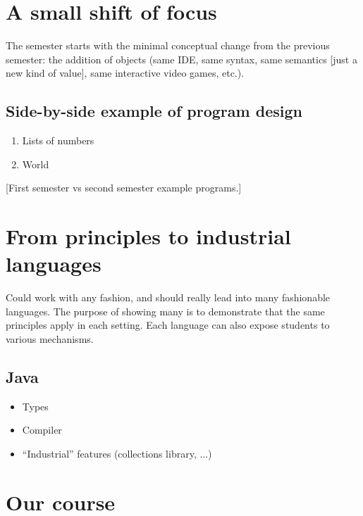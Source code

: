 \documentclass[submission,copyright]{eptcs}
\begin{document}
\cite{dvanhorn:Felleisen2004Structure}

\cite{dvanhorn:Findler2002DrScheme}

\cite{dvanhorn:Felleisen2001How}

\section{A small shift of focus}

The semester starts with the minimal conceptual change from the
previous semester: the addition of objects (same IDE, same syntax,
same semantics [just a new kind of value], same interactive video
games, etc.).

\subsection{Side-by-side example of program design}

\begin{enumerate}
\item Lists of numbers
\item World
\end{enumerate}



[First semester vs second semester example programs.]

\section{From principles to industrial languages}

Could work with any fashion, and should really lead into many
fashionable languages.  The purpose of showing many is to demonstrate
that the same principles apply in each setting.  Each language can also
expose students to various mechanisms.

\subsection{Java}

\begin{itemize}
\item Types
\item Compiler
\item ``Industrial'' features (collections library, ...)
\end{itemize}



\section{Our course}
\end{document}
